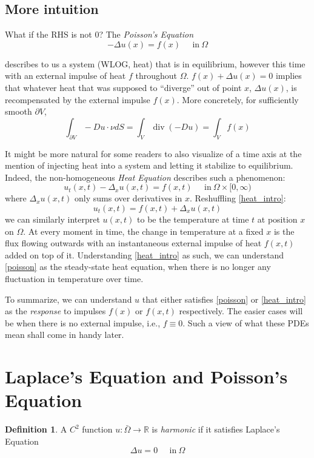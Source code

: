 \documentclass[openany, amssymb, psamsfonts]{amsart}
\theoremstyle{definition}
\newtheorem{defn}{Definition}[section]
\numberwithin{equation}{section}
\newcommand{\bbr}{\mathbb{R}}
\DeclareMathOperator{\Div}{div}
\begin{document}
\subsection{More intuition}
What if the RHS is not 0? The \textit{Poisson's Equation}
\begin{equation} \label{poisson}
    -\Delta u(x) = f(x) \;\;\;\;\; \text{in}\: \Omega
\end{equation}

describes to us a system (WLOG, heat) that is in equilibrium, however this time with an external impulse of heat $f$ throughout $\Omega$. $f(x) + \Delta u(x) = 0$ implies that whatever heat that was supposed to ``diverge'' out of point $x$, $\Delta u (x)$, is recompensated by the external impulse $f(x)$. More concretely, for sufficiently smooth $\partial V$, \[
    \int_{\partial V} -Du \cdot \nu dS = \int_V \Div (-Du) = \int_V f(x)
\]

It might be more natural for some readers to also visualize of a time axis at the mention of injecting heat into a system and letting it stabilize to equilibrium. Indeed, the non-homogeneous \textit{Heat Equation} describes such a phenomenon:
\begin{equation} \label{heat_intro}
    u_t(x, t) - \Delta_x u(x, t) = f(x, t) \;\;\;\;\; \text{in}\: \Omega \times [0, \infty)
\end{equation}
where $\Delta_x u(x, t)$ only sums over derivatives in $x$. Reshuffling \eqref{heat_intro}: \[u_t(x, t) = f(x, t) + \Delta_x u(x, t)\]
we can similarly interpret $u(x, t)$ to be the temperature at time $t$ at position $x$ on $\Omega$. At every moment in time, the change in temperature at a fixed $x$ is the flux flowing outwards with an instantaneous external impulse of heat $f(x, t)$ added on top of it. Understanding \eqref{heat_intro} as such, we can understand \eqref{poisson} as the steady-state heat equation, when there is no longer any fluctuation in temperature over time.

To summarize, we can understand $u$ that either satisfies \eqref{poisson} or \eqref{heat_intro} as the \textit{response} to impulses $f(x)$ or $f(x, t)$ respectively. The easier cases will be when there is no external impulse, i.e., $f \equiv 0$. Such a view of what these PDEs mean shall come in handy later.
\section{Laplace's Equation and Poisson's Equation}
\begin{defn}
    A $C^2$ function $u: \bar{\Omega} \to \bbr$ is \textit{harmonic} if it satisfies Laplace's Equation
    \begin{equation} \label{laplace}
        \Delta u = 0 \;\;\;\;\; \text{in}\: \Omega
    \end{equation}
\end{defn}
\end{document}

